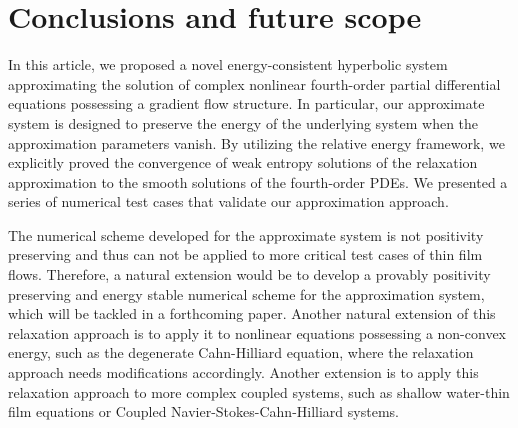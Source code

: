 \documentclass[11pt]{article}
\numberwithin{equation}{section}
\newtheorem{counter example}[theorem]{Counter Example}
\numberwithin{equation}{section}
\numberwithin{equation}{section}
\begin{document}
\section{Conclusions and future scope}\label{sec: conclusions}
In this article, we proposed a novel energy-consistent hyperbolic system approximating the solution of complex nonlinear fourth-order partial differential equations possessing a gradient flow structure. In particular, our approximate system is designed to preserve the energy of the underlying system when the approximation parameters vanish. By utilizing the relative energy framework, we explicitly proved the convergence of weak entropy solutions of the relaxation approximation to the smooth solutions of the fourth-order PDEs. We presented a series of numerical test cases that validate our approximation approach.

The numerical scheme developed for the approximate system is not positivity preserving and thus can not be applied to more critical test cases of thin film flows. Therefore, a natural extension would be to develop a provably positivity preserving and energy stable numerical scheme for the approximation system, which will be tackled in a forthcoming paper. Another natural extension of this relaxation approach is to apply it to nonlinear equations possessing a non-convex energy, such as the degenerate Cahn-Hilliard equation, where the relaxation approach needs modifications accordingly. Another extension is to apply this relaxation approach to more complex coupled systems, such as shallow water-thin film equations or Coupled Navier-Stokes-Cahn-Hilliard systems.


\end{document}
